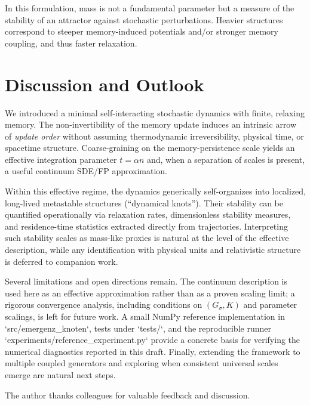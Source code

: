 \documentclass[reprint,amsmath,amssymb,aps,prd,nofootinbib,floatfix]{revtex4-2}
\begin{document}
In this formulation, mass is not a fundamental parameter but a measure of the stability of an attractor against stochastic perturbations.
Heavier structures correspond to steeper memory-induced potentials and/or stronger memory coupling, and thus faster relaxation.

\section{Discussion and Outlook}

We introduced a minimal self-interacting stochastic dynamics with finite, relaxing memory.
The non-invertibility of the memory update induces an intrinsic arrow of \emph{update order} without assuming thermodynamic irreversibility, physical time, or spacetime structure.
Coarse-graining on the memory-persistence scale yields an effective integration parameter $t=\alpha n$ and, when a separation of scales is present, a useful continuum SDE/FP approximation.

Within this effective regime, the dynamics generically self-organizes into localized, long-lived metastable structures (``dynamical knots'').
Their stability can be quantified operationally via relaxation rates, dimensionless stability measures, and residence-time statistics extracted directly from trajectories.
Interpreting such stability scales as mass-like proxies is natural at the level of the effective description, while any identification with physical units and relativistic structure is deferred to companion work.

Several limitations and open directions remain.
The continuum description is used here as an effective approximation rather than as a proven scaling limit; a rigorous convergence analysis, including conditions on $(G_\sigma,K)$ and parameter scalings, is left for future work.
A small NumPy reference implementation in `src/emergenz_knoten`, tests under `tests/`, and the reproducible runner `experiments/reference_experiment.py` provide a concrete basis for verifying the numerical diagnostics reported in this draft.
Finally, extending the framework to multiple coupled generators and exploring when consistent universal scales emerge are natural next steps.

\begin{acknowledgments}
The author thanks colleagues for valuable feedback and discussion.
\end{acknowledgments}



\end{document}
